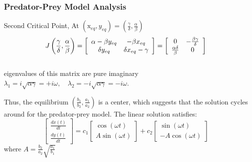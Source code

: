 







\begin{frame}
    \frametitle{Predator-Prey Model Analysis}
Second Critical Point, At $ \left( \mathrm { x } _ { e q } , y _ { e q } \right) =  \left( \frac { \gamma } { \delta } , \frac { \alpha } { \beta } \right) $ \\
\begin{equation*}
J \left( \frac { \gamma } { \delta } , \frac { \alpha } { \beta } \right)  = \left[ \begin{array} { c c } \alpha - \beta y _ { e q } & - \beta x _ { e q } \\ \delta y _ { e q } & \delta x _ { e q } - \gamma \end{array} \right] = \left[ \begin{array} { c c } 0 & - \frac { \beta \gamma } { \delta } \\ \frac { \alpha \delta } { \beta } & 0 \end{array} \right] 
\end{equation*} \\
eigenvalues of this matrix are pure imaginary $ \lambda _ { 1 } = i \sqrt { \alpha \gamma } = + i \omega , \quad \lambda _ { 2 } = - i \sqrt { \alpha \gamma } = - i \omega $.

Thus, the equilibrium $ \left( \frac { b _ { 1 } } { b _ { 2 } } , \frac { a _ { 1 } } { a _ { 2 } } \right) $ is a center, which suggests that the solution
cycles around for the predator-prey model. The linear solution satisfies:\\

\begin{equation*}
     \left[ \begin{array} { c } \frac { d x ( t ) } { d t } \\ \frac { d y ( t ) } { d t } \end{array} \right] = c _ { 1 } \left[ \begin{array} { c } \cos ( \omega t ) \\ A \sin ( \omega t ) \end{array} \right] + c _ { 2 } \left[ \begin{array} { c } \sin ( \omega t ) \\ - A \cos ( \omega t ) \end{array} \right]
\end{equation*}
where $ A = \frac { b _ { 2 } } { a _ { 2 } } \sqrt { \frac { a _ { 1 } } { b _ { 1 } } } $
\end{frame}

